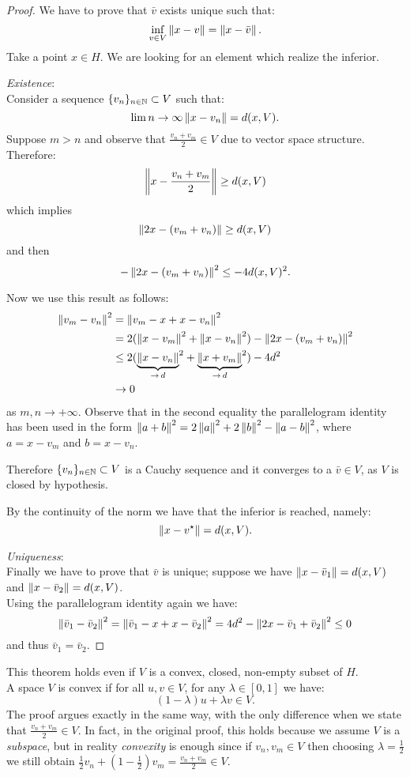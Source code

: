 \begin{proof} We have to prove that $\bar v$ exists unique such that:
	$$
	\inf\limits_{v \in V} \left\lVert x-v\right\rVert 
	= \left\lVert x-\bar v\right\rVert
	.
	$$
	Take a point $x \in H$. We are looking for an element which realize the inferior.
	
	\textit{Existence}:\\
	Consider a sequence $\{ v_n \}_{n \in \mathbb N} \subset V$ such that:
	$$ 
	\lim\limits{n \to \infty} \left\lVert x - v_n\right\rVert
	= d(x, V)
	.$$
	Suppose $m > n$ and observe that $\frac{v_n + v_m}{2}\in V$ due to vector space structure.\\
	Therefore:
	$$
	\left\lVert x - \frac{v_n + v_m}{2}\right\rVert 
	\geq d(x,V)
	$$
	which implies
	$$
	\left\lVert2x - (v_m + v_n)\right\rVert 
	\geq d(x,V)
	$$
	and then
	$$
	-\left\lVert2x - (v_m + v_n)\right\rVert^2 
	\leq -4 d(x,V)^2
	.
	$$
	
	Now we use this result as follows:
	\begin{align*}
		\left\lVert v_m - v_n\right\rVert^2 
		&= \left\lVert v_m -x +x -v_n\right\rVert^2 \\
		&= 2(\left\lVert x-v_m\right\rVert^2 + \left\lVert x-v_n\right\rVert^2) - \left\lVert2x - (v_m + v_n)\right\rVert^2 \\
		&\leq 2 ({\underbrace{\left\lVert x-v_n\right\rVert}_{\to \,d}}^2 
		+ {\underbrace{\left\lVert x+v_m\right\rVert}_{\to \, d}}^2)-4d^2  \\
		&\to 0
	\end{align*}
	as $m, n\to +\infty$. Observe that in the second equality the parallelogram identity has been used in the form $\left\lVert a+b\right\rVert^2 = 2\left\lVert a\right\rVert^2+2\left\lVert b\right\rVert^2-\left\lVert a-b\right\rVert^2$, where $a= x-v_m$ and $b = x-v_n$.
	
	Therefore $\{v_n\}_{n \in \mathbb N} \subset V$ is a Cauchy sequence and it converges to a $\bar v \in V$, as $V$ is closed by hypothesis.
	
	By the continuity of the norm we have that the inferior is reached, namely:
	$$\left\lVert x-v^\star\right\rVert
	= d(x,V).$$
	
	\textit{Uniqueness}:\\
	Finally we have to prove that $\bar v$ is unique; suppose we have $\left\lVert x-\bar v_1\right\rVert=d(x,V)$ and $\left\lVert x-\bar v_2\right\rVert=d(x,V)$.\\
	Using the parallelogram identity again we have:
	$$\left\lVert\bar v_1 - \bar v_2\right\rVert^2 
	= \left\lVert\bar v_1 -x +x -\bar v_2\right\rVert^2 
	= 4 d^2 - \left\lVert2x - \bar v_1 + \bar v_2\right\rVert^2 
	\leq 0$$
	and thus $\bar v_1 = \bar v_2$.
\end{proof}

This theorem holds even if $V$ is a convex, closed, non-empty subset of $H$.\\
A space $V$ is convex if for all $u,v \in V$, for any $\lambda \in [0,1]$ we have:
$$
(1- \lambda)u + \lambda v 
\in V
.
$$
The proof argues exactly in the same way, with the only difference when we state that $\frac{v_{n}+v_{m}}{2}\in V$. In fact, in the original proof, this holds because we assume $V$ is a \textit{subspace}, but in reality \textit{convexity} is enough since if $v_{n},v_{m}\in V$ then choosing $\lambda=\frac{1}{2}$ we still obtain $\frac{1}{2} v_{n}+(1-\frac{1}{2})v_{m}=\frac{v_{n}+v_{m}}{2}\in V$.
